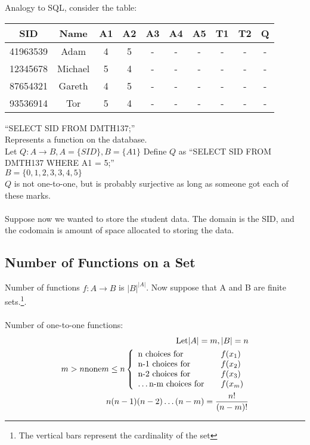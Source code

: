 Analogy to SQL, consider the table: \\
\begin{table}[!htb]
\begin{tabularx}{\linewidth}{| c c c c c c c c c c |}
\hline
  SID      & Name    & A1 & A2 & A3 & A4 & A5 & T1 & T2 & Q \\
\hline
  41963539 & Adam    &  4 &  5 &  - &  - &  - &  - &  - & - \\
  12345678 & Michael &  5 &  4 &  - &  - &  - &  - &  - & - \\
  87654321 & Gareth  &  4 &  5 &  - &  - &  - &  - &  - & - \\
  93536914 & Tor     &  5 &  4 &  - &  - &  - &  - &  - & - \\
\hline
\end{tabularx}
\end{table}
``SELECT SID FROM DMTH137;'' \\
Represents a function on the database.\\
Let $Q:A \to B,  A = \{SID\}, B=\{A1\}$
Define $Q$ as ``SELECT SID FROM DMTH137 WHERE A1 = 5;'' \\
$B = \{0,1,2,3,3,4,5\}$ \\
$Q$ is not one-to-one, but is probably surjective as long as someone got each
of these marks. \\
\\
Suppose now we wanted to store the student data. The domain is the SID, and
the codomain is amount of space allocated to storing the data.\\

\subsection{Number of Functions on a Set}
Number of functions $f: A \to B$ is $|B|^{|A|}$. Now suppose that A and B are
finite sets.\footnote{The vertical bars represent the cardinality of the set}.\\
\\
Number of one-to-one functions:
\begin{align}
  \text{Let} |A| = m, |B| = n \\
  m > n \text{none}
  m \leq n \left\{
    \begin{array}{l l}
      \text{n choices for} & \quad f(x_1) \\
      \text{n-1 choices for} & \quad f(x_2) \\
      \text{n-2 choices for} & \quad f(x_3) \\
      \ldots
      \text{n-m choices for} & \quad f(x_m) \\
    \end{array}
    \right. \\
  n(n-1)(n-2)\ldots(n-m) = \frac{n!}{(n-m)!}
\end{align}

